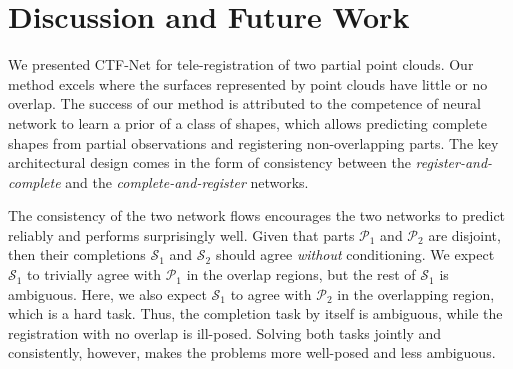 \section{Discussion and Future Work} \label{sec:future}

We presented CTF-Net for tele-registration of two partial point clouds. Our method excels where the surfaces represented by point clouds have little or no overlap. The success of our method is attributed to the competence of neural network to learn a prior of a class of shapes, which allows predicting complete shapes from partial observations and registering non-overlapping parts. The key architectural design comes in the form of consistency between the \emph{register-and-complete} and the \emph{complete-and-register} networks.

The consistency of the two network flows encourages the two networks to predict reliably and performs surprisingly well. Given that parts $\mathcal{P}_1$ and $\mathcal{P}_2$ are disjoint, then their completions $\mathcal{S}_1$ and $\mathcal{S}_2$ should agree \textit{without} conditioning. We expect $\mathcal{S}_1$ to trivially agree with $\mathcal{P}_1$ in the overlap regions, but the rest of $\mathcal{S}_1$ is ambiguous. Here, we also expect $\mathcal{S}_1$ to agree with $\mathcal{P}_2$ in the overlapping region, which is a hard task.
Thus, the completion task by itself is ambiguous, while the registration with no overlap is ill-posed. Solving both tasks jointly and consistently, however, makes the problems more well-posed and less ambiguous.



